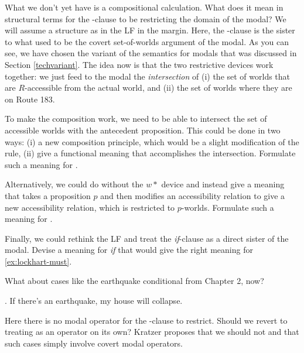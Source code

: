What 
%
%
we don't yet have is a compositional calculation. What does it mean in structural terms for the -clause to be restricting the domain of the modal? We will assume a structure as in the LF in the margin. Here, the -clause is the sister to what used to be the covert set-of-worlds argument of the modal. As you can see, we have chosen the variant of the semantics for modals that was discussed in Section \ref{techvariant}. The idea now is that the two restrictive devices work together: we just feed to the modal the \emph{intersection} of (i) the set of worlds that are $R$-accessible from the actual world, and (ii) the set of worlds where they are on Route 183.

\begin{exercise}
	
	To make the composition work, we need to be able to intersect the set of accessible worlds with the antecedent proposition. This could be done in two ways: (i) a new composition principle, which would be a slight modification of the  rule, (ii) give  a functional meaning that accomplishes the intersection. Formulate such a meaning for .
	
	Alternatively, we could do without the $w*$ device and instead give  a meaning that takes a proposition $p$ and then modifies an accessibility relation to give a new accessibility relation, which is restricted to $p$-worlds. Formulate such a meaning for . 

Finally, we could rethink the LF and treat the \emph{if}-clause as a direct sister of the modal. Devise a meaning for \emph{if} that would give the right meaning for \ref{ex:lockhart-must}.\eex
\end{exercise}

What about cases like the earthquake conditional from Chapter 2, now? 

\ex. If there's an earthquake, my house will collapse.

Here there is no modal operator for the -clause to restrict. Should we revert to treating  as an operator on its own? Kratzer proposes that we should not and that such cases simply involve covert modal operators. %


